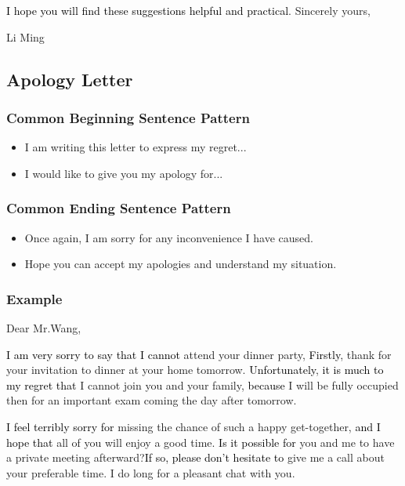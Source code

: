 \documentclass{article}
\begin{document}
\par \textcolor{black}{I hope you will find these suggestions helpful and practical}.
\hfill Sincerely yours,

\hfill Li Ming

\subsection{Apology Letter}
\label{sec:letter}

\subsubsection{Common Beginning Sentence Pattern}
\label{sec:comm-begnn-sent}
\begin{itemize}
\item I am writing this letter to express my regret...
\item I would like to give you my apology for...
\end{itemize}

\subsubsection{Common Ending Sentence Pattern}
\label{sec:comm-ending-sent-2}
\begin{itemize}
\item Once again, I am sorry for any inconvenience I have caused.
\item Hope you can accept my apologies and understand my situation.
\end{itemize}

\subsubsection{Example}
\label{sec:example-2}
Dear Mr.Wang,
\par \textcolor{black}{I am very sorry to say that I cannot }attend your dinner party,
\textcolor{black} {Firstly}, thank for your invitation to dinner at your home
tomorrow. \textcolor{black}{Unfortunately}, \textcolor{black}{it is much to my regret that} I
cannot join you and your family, \textcolor{black}{because} I will be fully occupied then
for an important exam coming the day after tomorrow.

\par \textcolor{black}{I feel terribly sorry for} missing the chance of such a happy
get-together, \textcolor{black}{and I hope that} all of you will enjoy a good
time. \textcolor{black}{Is it possible for} you and me to have a private meeting
afterward?\textcolor{black}{If so, please don't hesitate to }give me a call about your
preferable time. I do long for a pleasant chat with you.
\end{document}

